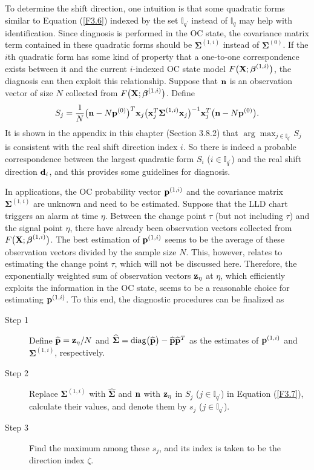 To determine the shift direction, one intuition is that some quadratic forms similar
to Equation (\ref{F3.6}) indexed by the set $\mathbb{I}_{q^{\prime}}$ instead of
$\mathbb{I}_q$ may help with identification. Since diagnosis is performed in the OC
state, the covariance matrix term contained in these quadratic forms should be
$\bm{\Sigma}^{(1,i)}$ instead of $\bm{\Sigma}^{(0)}$. If the $i$th quadratic form
has some kind of property that a one-to-one correspondence exists between it and the
current $i$-indexed OC state model $F\big({\bf X};\boldsymbol\beta^{(1,i)}\big)$, the
diagnosis can then exploit this relationship. Suppose that ${\bf n}$ is an
observation vector of size $N$ collected from $F\big({\bf X};\boldsymbol\beta^{(1,i)}\big)$.
Define
\begin{equation}
S_j=\frac{1}{N}\big({\bf n}-N{\bf p}^{(0)}\big)^T{\bf x}_j\big({\bf
x}_j^T\bm{\Sigma}^{(1,i)}{\bf x}_j\big)^{-1}{\bf x}_j^T\big({\bf n}-N{\bf
p}^{(0)}\big).\label{F3.7}
\end{equation}
It is shown in the appendix in this chapter (Section 3.8.2) that
$\arg\max_{j\in\mathbb{I}_{q^{\prime}}}S_j$ is consistent with the real shift
direction index $i$. So there is indeed a probable correspondence between the
largest quadratic form $S_i$ ($i\in\mathbb{I}_{q^{\prime}}$) and the real shift
direction ${\bf d}_i$, and this provides some guidelines for diagnosis.

In applications, the OC probability vector ${\bf p}^{(1,i)}$ and the covariance
matrix $\bm{\Sigma}^{(1,i)}$ are unknown and need to be estimated. Suppose that the
LLD chart triggers an alarm at time $\eta$. Between the change point $\tau$ (but not
including $\tau$) and the signal point $\eta$, there have already been observation
vectors collected from $F\big({\bf X};\boldsymbol\beta^{(1,i)}\big)$. The best estimation of
${\bf p}^{(1,i)}$ seems to be the average of these observation vectors divided by
the sample size $N$. This, however, relates to estimating the change point $\tau$,
which will not be discussed here. Therefore, the exponentially weighted sum of
observation vectors ${\bf z}_{\eta}$ at $\eta$, which efficiently exploits the
information in the OC state, seems to be a reasonable choice for estimating ${\bf
p}^{(1,i)}$. To this end, the diagnostic procedures can be finalized as
\begin{description}
\item[Step 1] Define
$\widehat{{\bf p}}={\bf z}_{\eta}/N$ and
$\widehat{\boldsymbol{\Sigma}}=\mathrm{diag}\big(\widehat{{\bf p}}\big)-\widehat{{\bf p}}\widehat{{\bf
p}}^T$ as the estimates of ${\bf p}^{(1,i)}$ and $\bm{\Sigma}^{(1,i)}$,
respectively.
\item[Step 2] Replace $\bm{\Sigma}^{(1,i)}$ with $\widehat{\bm{\Sigma}}$ and ${\bf n}$
with ${\bf z}_{\eta}$ in $S_j$ ($j\in\mathbb{I}_{q^{\prime}}$) in Equation
(\ref{F3.7}), calculate their values, and denote them by $s_j$
($j\in\mathbb{I}_{q^{\prime}}$).
\item[Step 3] Find the maximum among these $s_j$, and its index is taken to be the
direction index $\zeta$.
\end{description}



